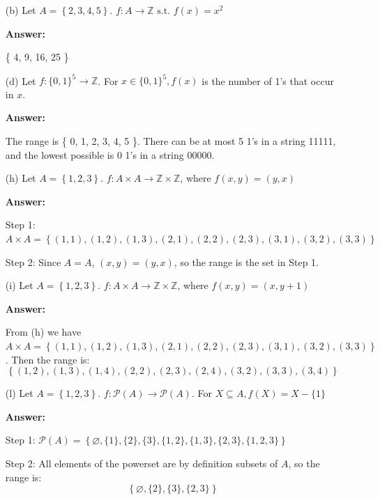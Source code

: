 \documentclass[14pt]{extreport}
\newcommand{\answer}[0]{\medskip \textbf{Answer:} \medskip}
\newcommand{\Z}[0]{\mathbb{Z}}
\begin{document}
\begin{enumerate}
    
    \item[(b)] Let \( A = \left\{ 2, 3, 4, 5 \right\} \). \( f: A \rightarrow \Z \text{ s.t. } f(x) = x^2 \)
    
        \answer

        \{ 4, 9, 16, 25 \}
    
    \item[(d)] Let \( f: \{0, 1\}^{5} \rightarrow \Z \). For \( x \in \{ 0, 1 \}^5, f(x) \) is the number of 1's that occur in \( x \).

        \answer

        The range is \{ 0, 1, 2, 3, 4, 5 \}. There can be at most 5 1's in a string 11111, and the lowest possible is 0 1's in a string 00000.

    \item[(h)] Let \( A = \left\{ 1, 2, 3 \right\} \). \( f: A \times A \rightarrow \Z \times \Z \), where \( f(x, y) = (y, x) \)
    
        \answer

        Step 1: \( A \times A = \left\{ (1, 1), (1, 2), (1, 3), (2, 1), (2, 2), (2, 3), (3, 1), (3, 2), (3, 3) \right\} \)

        \medskip

        Step 2: Since \( A = A \), \( (x, y) = (y, x) \), so the range is the set in Step 1.

    \item[(i)] Let \( A = \left\{ 1, 2, 3 \right\} \). \( f: A \times A \rightarrow \Z \times \Z \), where \( f(x, y) = (x, y + 1) \)
    
        \answer

        From (h) we have \( A \times A = \left\{ (1, 1), (1, 2), (1, 3), (2, 1), (2, 2), (2, 3), (3, 1), (3, 2), (3, 3) \right\} \). Then the range is:
        \[
            \left\{ (1, 2), (1, 3), (1, 4), (2, 2), (2, 3), (2, 4), (3, 2), (3, 3), (3, 4) \right\}
        \]

    \item[(l)] Let \( A = \left\{ 1, 2, 3 \right\} \). \( f: \mathcal{P}(A) \rightarrow \mathcal{P}(A) \). For \( X \subseteq A, f(X) = X - \{1\} \)
    
        \answer

        Step 1: \( \mathcal{P}(A) = \left\{ \varnothing, \{ 1 \}, \{ 2 \}, \{ 3 \}, \{ 1, 2 \}, \{ 1, 3 \}, \{ 2, 3 \}, \{ 1, 2, 3 \} \right\} \)

        \medskip

        Step 2: All elements of the powerset are by definition subsets of \( A \), so the range is:
        \[
            \left\{ \varnothing, \{ 2 \}, \{ 3 \}, \{ 2, 3 \} \right\} 
        \]
        
\end{enumerate}
\newpage
\end{document}
